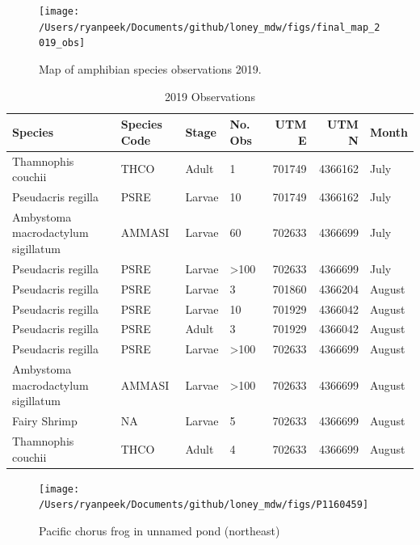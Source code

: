 \documentclass[11pt,a4paper,]{article}
\begin{document}
\begin{figure}

{\centering \texttt{[image: /Users/ryanpeek/Documents/github/loney\_mdw/figs/final\_map\_2019\_obs]} 

}

\caption{Map of amphibian species observations 2019.}\label{fig:fig5}
\end{figure}

\begin{longtable}[t]{l|l|l|l|r|r|l}
\caption{\label{tab:table2}2019 Observations}\\
\hline
\textbf{Species} & \textbf{Species Code} & \textbf{Stage} & \textbf{No. Obs} & \textbf{UTM E} & \textbf{UTM N} & \textbf{Month}\\
\hline
\hline
Thamnophis couchii & THCO & Adult & 1 & 701749 & 4366162 & July\\
\hline
Pseudacris regilla & PSRE & Larvae & 10 & 701749 & 4366162 & July\\
\hline
Ambystoma macrodactylum sigillatum & AMMASI & Larvae & 60 & 702633 & 4366699 & July\\
\hline
Pseudacris regilla & PSRE & Larvae & >100 & 702633 & 4366699 & July\\
\hline
Pseudacris regilla & PSRE & Larvae & 3 & 701860 & 4366204 & August\\
\hline
Pseudacris regilla & PSRE & Larvae & 10 & 701929 & 4366042 & August\\
\hline
Pseudacris regilla & PSRE & Adult & 3 & 701929 & 4366042 & August\\
\hline
Pseudacris regilla & PSRE & Larvae & >100 & 702633 & 4366699 & August\\
\hline
Ambystoma macrodactylum sigillatum & AMMASI & Larvae & >100 & 702633 & 4366699 & August\\
\hline
Fairy Shrimp & NA & Larvae & 5 & 702633 & 4366699 & August\\
\hline
Thamnophis couchii & THCO & Adult & 4 & 702633 & 4366699 & August\\
\hline
\end{longtable}

\pagebreak

\begin{figure}

{\centering \texttt{[image: /Users/ryanpeek/Documents/github/loney\_mdw/figs/P1160459]} 

}

\caption{Pacific chorus frog in unnamed pond (northeast)}\label{fig:fig6}
\end{figure}
\end{document}
